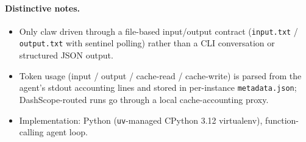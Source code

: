\paragraph{Distinctive notes.}
\begin{itemize}
  \item Only claw driven through a file-based input/output contract
  (\texttt{input.txt} / \texttt{output.txt} with sentinel polling) rather than
  a CLI conversation or structured JSON output.
  \item Token usage (input / output / cache-read / cache-write) is parsed from
  the agent's stdout accounting lines and stored in per-instance
  \texttt{metadata.json}; DashScope-routed runs go through a local
  cache-accounting proxy.
  \item Implementation: Python (\texttt{uv}-managed CPython 3.12 virtualenv),
  function-calling agent loop.
\end{itemize}
